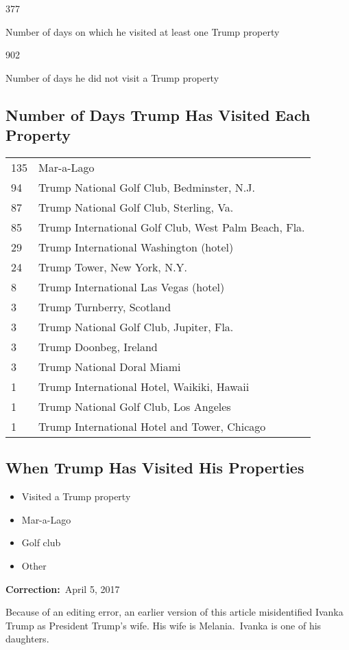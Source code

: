 377

Number of days on which he visited at least one Trump property

902

Number of days he did not visit a Trump property

\hypertarget{number-of-days-trump-has-visited-each-property}{%
\subsection{Number of Days Trump Has Visited Each
Property}\label{number-of-days-trump-has-visited-each-property}}

\begin{longtable}[]{@{}ll@{}}
\toprule
\endhead
135 & Mar-a-Lago\tabularnewline
94 & Trump National Golf Club, Bedminster, N.J.\tabularnewline
87 & Trump National Golf Club, Sterling, Va.\tabularnewline
85 & Trump International Golf Club, West Palm Beach, Fla.\tabularnewline
29 & Trump International Washington (hotel)\tabularnewline
24 & Trump Tower, New York, N.Y.\tabularnewline
8 & Trump International Las Vegas (hotel)\tabularnewline
3 & Trump Turnberry, Scotland\tabularnewline
3 & Trump National Golf Club, Jupiter, Fla.\tabularnewline
3 & Trump Doonbeg, Ireland\tabularnewline
3 & Trump National Doral Miami\tabularnewline
1 & Trump International Hotel, Waikiki, Hawaii\tabularnewline
1 & Trump National Golf Club, Los Angeles\tabularnewline
1 & Trump International Hotel and Tower, Chicago\tabularnewline
\bottomrule
\end{longtable}

\hypertarget{when-trump-has-visited-his-properties}{%
\subsection{When Trump Has Visited His
Properties}\label{when-trump-has-visited-his-properties}}

\begin{itemize}
\item
  Visited a Trump property
\item
  Mar-a-Lago
\item
  Golf club
\item
  Other
\end{itemize}

\textbf{Correction:}~April 5, 2017

Because of an editing error, an earlier version of this article
misidentified Ivanka Trump as President Trump's wife. His wife is
Melania.~Ivanka is one of his daughters.

